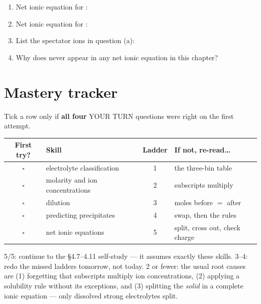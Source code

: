 \documentclass{apchem-worksheet}
\begin{document}
\begin{yourturn}
\begin{enumerate}[leftmargin=*,itemsep=0.5em]
  \item Net ionic equation for :
        \workspace[1.6cm]
  \item Net ionic equation for :
        \workspace[1.6cm]
  \item List the spectator ions in question (a): \workspace[1.2cm]
  \item Why does  never appear in any net ionic equation in this
        chapter? \workspace[1.6cm]
\end{enumerate}
\end{yourturn}

\section*{\sffamily Mastery tracker}

Tick a row only if \textbf{all four} YOUR TURN questions were right on
the first attempt.

\renewcommand{\arraystretch}{1.35}
\noindent\begin{tabular}{@{}c p{6.6cm} c p{4.4cm}@{}}
\toprule
\textbf{First try?} & \textbf{Skill} & \textbf{Ladder} &
  \textbf{If not, re-read\ldots}\\
\midrule
$\square$ & electrolyte classification & 1 & the three-bin table \\
$\square$ & molarity and ion concentrations & 2 & subscripts multiply \\
$\square$ & dilution & 3 & moles before $=$ after \\
$\square$ & predicting precipitates & 4 & swap, then the rules \\
$\square$ & net ionic equations & 5 & split, cross out, check charge \\
\bottomrule
\end{tabular}

\begin{apcnote}
5/5: continue to the \S4.7--4.11 self-study --- it assumes exactly these
skills. 3--4: redo the missed ladders tomorrow, not today. 2 or fewer:
the usual root causes are (1) forgetting that subscripts multiply ion
concentrations, (2) applying a solubility rule without its exceptions,
and (3) splitting the \emph{solid} in a complete ionic equation ---
only dissolved strong electrolytes split.
\end{apcnote}
\end{document}
